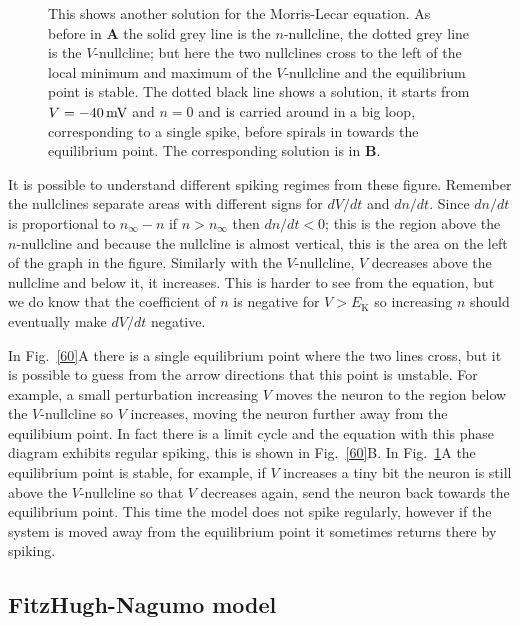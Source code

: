 \documentclass[12pt]{article}
\newcommand{\mV}{\mbox{\,mV}}
\begin{document}
\begin{figure}
\begin{center}

\end{center}
\caption{This shows another solution for the Morris-Lecar equation. As before in \textbf{A} the solid grey line is the
  $n$-nullcline, the dotted grey line is the $V$-nullcline; but here the two
  nullclines cross to the left of the local minimum and maximum of the
  $V$-nullcline and the equilibrium point is stable. The dotted
  black line shows a solution, it starts from $V=-40\mV$ and $n=0$ and
  is carried around in a big loop, corresponding to a single spike, before spirals in towards the equilibrium point. The corresponding solution is in
  \textbf{B}.  \label{40}}
\end{figure}


It is possible to understand different spiking regimes from these
figure. Remember the nullclines separate areas with different signs
for $dV/dt$ and $dn/dt$. Since $dn/dt$ is proportional to $n_\infty-n$
if $n>n_\infty$ then $dn/dt<0$; this is the region above the
$n$-nullcline and because the nullcline is almost vertical, this is
the area on the left of the graph in the figure. Similarly with the
$V$-nullcline, $V$ decreases above the nullcline and below it, it
increases. This is harder to see from the equation, but we do know
that the coefficient of $n$ is negative for $V>E_{\text{K}}$ so increasing $n$
should eventually make $dV/dt$ negative.

In Fig.~\ref{60}A there is a single equilibrium point where the two
lines cross, but it is possible to guess from the arrow directions
that this point is unstable. For example, a small perturbation
increasing $V$ moves the neuron to the region below the $V$-nullcline
so $V$ increases, moving the neuron further away from the equilibium
point. In fact there is a limit cycle and the equation with this phase
diagram exhibits regular spiking, this is shown in Fig.~\ref{60}B. In
Fig.~\ref{40}A the equilibrium point is stable, for example, if $V$
increases a tiny bit the neuron is still above the $V$-nullcline so
that $V$ decreases again, send the neuron back towards the equilibrium
point. This time the model does not spike regularly, however if the
system is moved away from the equilibrium point it sometimes returns
there by spiking.

\subsection*{FitzHugh-Nagumo model}
\end{document}
